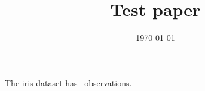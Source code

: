 


\title{
	Test paper%
}
\author{}
\date{\today}






\begin{titlepage}
  \maketitle

	\begin{abstract}
		\noindent

	\end{abstract}

\end{titlepage}


The iris dataset has \irisobs~observations.


\clearpage
\renewcommand*{\bibfont}{\small}
\printbibliography







